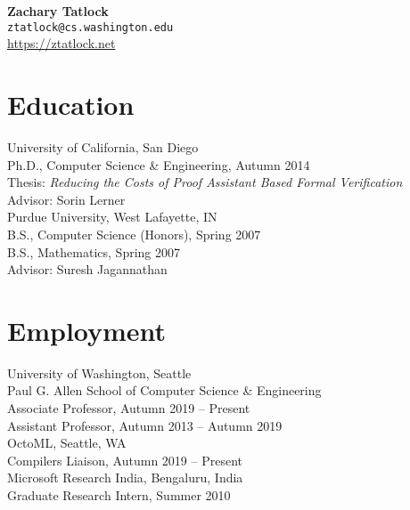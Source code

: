 \documentclass[10pt]{article}
\begin{document}
{\LARGE \textbf{Zachary Tatlock}} \\
\texttt{ztatlock@cs.washington.edu} \\
\url{https://ztatlock.net}


\section*{Education}

University of California, San Diego \\
Ph.D., Computer Science \& Engineering, Autumn 2014 \\
Thesis: \textit{Reducing the Costs of Proof Assistant Based Formal Verification} \\
Advisor: Sorin Lerner \\

Purdue University, West Lafayette, IN \\
B.S., Computer Science (Honors), Spring 2007 \\
B.S., Mathematics, Spring 2007 \\
Advisor: Suresh Jagannathan


\section*{Employment}

University of Washington, Seattle \\
Paul G. Allen School of Computer Science \& Engineering \\
Associate Professor, Autumn 2019 -- Present \\
Assistant Professor, Autumn 2013 -- Autumn 2019 \\

OctoML, Seattle, WA \\
Compilers Liaison, Autumn 2019 -- Present \\


Microsoft Research India, Bengaluru, India \\
Graduate Research Intern, Summer 2010 %
\end{document}
